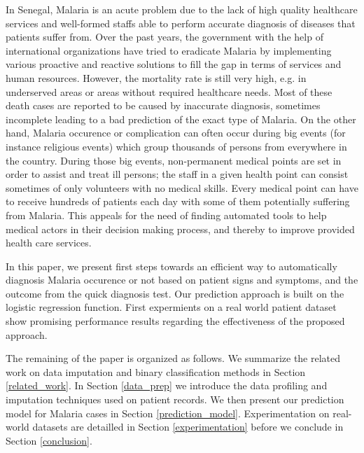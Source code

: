 In Senegal, Malaria is an acute problem  due to the lack of high quality healthcare services and well-formed
staffs able to perform accurate diagnosis of diseases that patients suffer from. Over the past years, the government with 
the help of international organizations have tried to eradicate Malaria by implementing various proactive and reactive solutions 
to fill the gap in terms of services and human resources. However, the mortality rate is still very high, e.g. in underserved areas
or areas without required healthcare needs. Most of these death cases are reported to be caused by inaccurate diagnosis, sometimes 
incomplete leading to a bad prediction of the exact type of Malaria.
On the other hand, Malaria occurence or complication can often occur  during  big events (for instance religious events)
which group thousands of persons from everywhere in the country. During those big events, non-permanent medical points are set in order
to assist and treat ill persons; the staff in a given health point can consist sometimes of only volunteers with no medical skills. Every medical 
point can have to receive hundreds of patients each day with some of them potentially suffering from Malaria. 
This appeals for the need of finding automated tools to help medical actors in their decision making process, and thereby to improve provided 
health care services.   

In this paper, we present first steps towards an efficient way to automatically diagnosis Malaria occurence or not based on patient signs and symptoms, and the outcome from the quick diagnosis test. Our prediction approach is built on the logistic regression function. First expermients on a real world patient dataset show promising performance results regarding the effectiveness of the proposed approach.

The remaining of the paper is organized as follows. We summarize the related work on data imputation and binary classification methods in Section \ref{related_work}.
In Section \ref{data_prep} we introduce the data profiling and imputation techniques used on patient records. We then present our prediction model for Malaria cases in Section \ref{prediction_model}.
Experimentation on real-world datasets are detailled in Section \ref{experimentation} before we conclude in Section \ref{conclusion}. 
